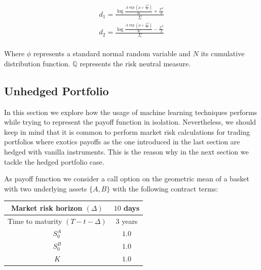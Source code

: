 $$
\begin{aligned}
d_1 = \frac{\log\frac{A\exp\left(\mu+\frac{\Sigma^2}{2}\right)}{K}+\frac{\Sigma^2}{2}}{\Sigma} \\
d_2 = \frac{\log\frac{A\exp\left(\mu+\frac{\Sigma^2}{2}\right)}{K}-\frac{\Sigma^2}{2}}{\Sigma} \\
\end{aligned}
$$



Where $\phi$ represents a standard normal random variable and $N$ its cumulative distribution function. $\mathbb{Q}$ represents the risk neutral measure.


\subsection{Unhedged Portfolio}
 In this section we explore how the usage of machine learning techniques performs while trying to represent the payoff function in isolation. Nevertheless, we should keep in mind that it is common to perform market risk calculations for trading portfolios where exotics payoffs as the one introduced in the last section are hedged with vanilla instruments. This is the reason why in the next section we tackle the hedged portfolio case. 
 
 As payoff function we consider a call option on the geometric mean of a basket with two underlying assets $\{A,B\}$ with the following contract terms:
 
 
\begin{center}
\begin{tabular}{||c | c||} 
 \hline
 Market risk horizon $(\Delta)$ & $10$ days \\ 
 \hline
 Time to maturity $(T-t-\Delta)$ & $3$ years \\
 \hline
 $S_0^A$ & $1.0$ \\
 \hline
 $S_0^B$ & $1.0$ \\
 \hline
 $K$ & $1.0$ \\
 \hline
 \end{tabular}
\end{center}

